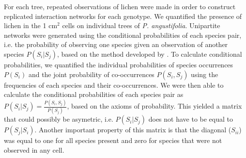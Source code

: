 \documentclass[11pt,twocolumn,twoside,lineno]{pnas-new}
\begin{document}
{For each tree, repeated observations of lichen were made in order to
construct replicated interaction networks for each genotype. We
quantified the presence of lichen in the 1 cm$^2$ cells on individual
trees of \textit{P. angustifolia}. Unipartite networks were generated
using the conditional probabilities of each species pair, i.e. the
probability of observing one species given an observation of another
species $P(S_i | S_j)$, based on the method developed by
\citep{Araujo2011}. To calculate conditional probabilities, we
quantified the individual probabilities of species occurrences
$P(S_i)$ and the joint probability of co-occurrences $P(S_i,S_j)$
using the frequencies of each species and their co-occurrences. We
were then able to calculate the conditional probabilities of each
species pair as $P(S_i|S_j) = \frac{P(S_i,S_j)}{P(S_j)}$, based on the
axioms of probability. This yielded a matrix that could possibly be
asymetric, i.e. $P(S_i|S_j)$ does not have to be equal to
$P(S_j|S_i)$. Another important property of this matrix is that the
diagonal ($S_{ii}$) was equal to one for all species present and zero
for species that were not observed in any cell.

}
\end{document}
